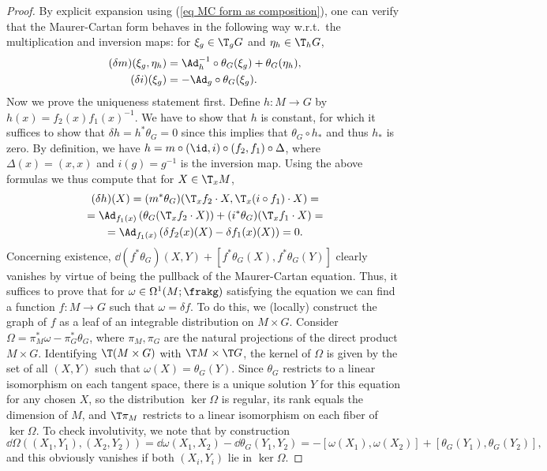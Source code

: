 \begin{proof}
    By explicit expansion using (\ref{eq MC form as composition}), one can verify that the Maurer-Cartan form behaves in the following way w.r.t.\ the multiplication and inversion maps: for $\xi_g\in \T_g G$ and $\eta_h\in \T_hG$,
    \begin{align}
       (\delta m)(\xi_g,\eta_h)&=\Ad_{h}^{-1}\circ \theta_G(\xi_g)+\theta_G(\eta_h),   \label{eq MC form under m}  \\
       (\delta i)(\xi_g)&=-\Ad_g\circ\theta_G(\xi_g). \label{eq MC form under i}
    \end{align}
    Now we prove the uniqueness statement first. Define $h:M\to G$ by $h(x)=f_2(x)f_1(x)^{-1}$. We have to show that $h$ is constant, for which it suffices to show that $\delta h=h^\ast\theta_G=0$ since this implies that $\theta_G\circ h_\ast$ and thus $h_\ast$ is zero. By definition, we have $h=m\circ (\id,i)\circ(f_2,f_1)\circ \Delta$, where $\Delta(x)=(x,x)$ and $i(g)=g^{-1}$ is the inversion map. Using the above formulas we thus compute that for $X\in \T_xM$,
    \begin{multline}
        (\delta h)(X)=(m^\ast \theta_G)(\T_x f_2\cdot X,\T_x(i\circ f_1)\cdot X)=\\
        =\Ad_{f_1(x)}\left(\theta_G(\T_xf_2\cdot X)\right)+(i^\ast\theta_G)(\T_xf_1\cdot X)=\\
        =\Ad_{f_1(x)}\left(\delta f_2(x)(X)-\delta f_1(x)(X)\right)=0.
    \end{multline}
    Concerning existence, $\dd(f^\ast\theta_G)(X,Y)+[f^\ast\theta_G(X),f^\ast\theta_G(Y)]$ clearly vanishes by virtue of being the pullback of the Maurer-Cartan equation. Thus, it suffices to prove that for $\omega\in\Omega^1(M;\frakg)$ satisfying the equation we can find a function $f:M\to G$ such that $\omega=\delta f$. To do this, we (locally) construct the graph of $f$ as a leaf of an integrable distribution on $M\times G$. Consider $\Omega=\pi^\ast_M\omega-\pi^\ast_G \theta_G$, where $\pi_M,\pi_G$ are the natural projections of the direct product $M\times G$. Identifying $\T(M\times G)$ with $\T M\times \T G$, the kernel of $\Omega$ is given by the set of all $(X,Y)$ such that $\omega(X)=\theta_G(Y)$. Since $\theta_G$ restricts to a linear isomorphism on each tangent space, there is a unique solution $Y$ for this equation for any chosen $X$, so the distribution $\ker\Omega$ is regular, its rank equals the dimension of $M$, and $\T\pi_M$ restricts to a linear isomorphism on each fiber of $\ker \Omega$. To check involutivity, we note that by construction
    \[\dd\Omega\left((X_1,Y_1),(X_2,Y_2)\right)=\dd\omega(X_1,X_2)-\dd \theta_G(Y_1,Y_2)=-[\omega(X_1),\omega(X_2)]+[\theta_G(Y_1),\theta_G(Y_2)],\]
    and this obviously vanishes if both $(X_i,Y_i)$ lie in $\ker\Omega$.


\end{proof}
